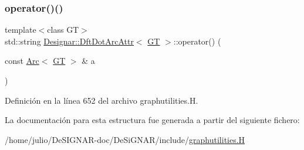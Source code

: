 \subsubsection{\texorpdfstring{operator()()}{operator()()}}
{\footnotesize\ttfamily template$<$class GT$>$ \\
std\+::string \hyperlink{struct_designar_1_1_dft_dot_arc_attr}{Designar\+::\+Dft\+Dot\+Arc\+Attr}$<$ \hyperlink{demo-buildgraph_8_c_a3001c40d2c31ca87ed96cd7d1334a55e}{GT} $>$\+::operator() (\begin{DoxyParamCaption}\item[{const \hyperlink{namespace_designar_a3f55fb5513d62ff47cbc8f72b8e95d6f}{Arc}$<$ \hyperlink{demo-buildgraph_8_c_a3001c40d2c31ca87ed96cd7d1334a55e}{GT} $>$ \&}]{a }\end{DoxyParamCaption})\hspace{0.3cm}{\ttfamily [inline]}}



Definición en la línea 652 del archivo graphutilities.\+H.



La documentación para esta estructura fue generada a partir del siguiente fichero\+:\begin{DoxyCompactItemize}
\item 
/home/julio/\+De\+S\+I\+G\+N\+A\+R-\/doc/\+De\+Si\+G\+N\+A\+R/include/\hyperlink{graphutilities_8_h}{graphutilities.\+H}\end{DoxyCompactItemize}
